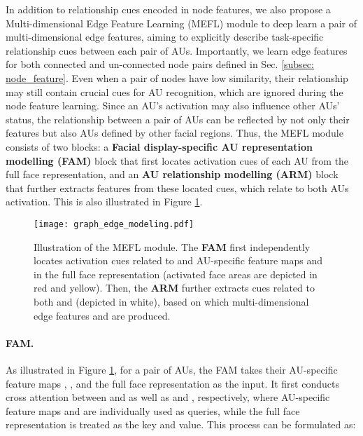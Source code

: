 \documentclass{article}
\begin{document}
\noindent In addition to relationship cues encoded in node features, we also propose a Multi-dimensional Edge Feature Learning (MEFL) module to deep learn a pair of multi-dimensional edge features, aiming to explicitly describe task-specific relationship cues between each pair of AUs. Importantly, we learn edge features for both connected and un-connected node pairs defined in Sec. \ref{subsec: node_feature}. Even when a pair of nodes have low similarity, their relationship may still contain crucial cues for AU recognition, which are ignored during the node feature learning. Since an AU's activation may also influence other AUs' status, the relationship between a pair of AUs can be reflected by not only their features but also AUs defined by other facial regions. Thus, the MEFL module consists of two blocks: a \textbf{Facial display-specific AU representation modelling (FAM)} block that first locates activation cues of each AU from the full face representation, and an \textbf{AU relationship modelling (ARM)} block that further extracts features from these located cues, which relate to both AUs activation. This is also illustrated in Figure \ref{fig:method_GEM}.






\begin{figure}[htb]
  \centering
  \texttt{[image: graph\_edge\_modeling.pdf]}
  \caption{Illustration of the MEFL module. The \textbf{FAM} first independently locates activation cues related to  and  AU-specific feature maps  and  in the full face representation  (activated face areas are depicted in red and yellow). Then, the \textbf{ARM} further extracts cues related to both  and  (depicted in white), based on which multi-dimensional edge features  and  are produced.}
\label{fig:method_GEM}
\end{figure}





\paragraph{FAM.} As illustrated in Figure \ref{fig:method_GEM}, for a pair of AUs, the FAM takes their AU-specific feature maps , , and the full face representation  as the input. It first conducts cross attention between  and  as well as  and , respectively, where AU-specific feature maps  and  are individually used as queries, while the full face representation  is treated as the key and value. This process can be formulated as:
\end{document}
